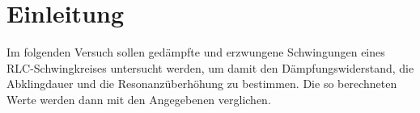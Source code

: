 \section{Einleitung}
\label{sec:einleitung}
Im folgenden Versuch sollen gedämpfte und erzwungene Schwingungen eines RLC-Schwingkreises untersucht werden, um damit den 
Dämpfungswiderstand, die Abklingdauer und die Resonanzüberhöhung zu bestimmen. Die so berechneten Werte werden dann mit den
Angegebenen verglichen. 